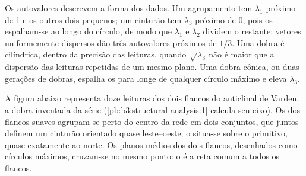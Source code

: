 Os autovalores descrevem a forma dos dados. Um agrupamento tem $\lambda_1$ próximo de
1 e os outros dois pequenos; um cinturão tem $\lambda_3$ próximo de 0, pois os 
espalham-se ao longo do círculo, de modo que $\lambda_1$ e $\lambda_2$ dividem o restante;
vetores uniformemente dispersos dão três autovalores próximos de $1/3$. Uma dobra é
cilíndrica, dentro da precisão das leituras, quando $\sqrt{\lambda_3}$ não é
maior que a dispersão das leituras repetidas de um mesmo plano. Uma dobra cônica,
ou duas gerações de dobras, espalha os  para longe de qualquer círculo máximo
e eleva $\lambda_3$.

A figura abaixo representa doze leituras dos dois flancos do anticlinal de Varden,
a dobra inventada da série (\cref{pb:b3:structural-analysis:1}
calcula seu eixo). Os  dos flancos suaves agrupam-se perto do centro da
rede em dois conjuntos, que juntos definem um cinturão orientado quase
leste--oeste; o  situa-se sobre o primitivo, quase exatamente ao norte. Os
planos médios dos dois flancos, desenhados como círculos máximos, cruzam-se no mesmo ponto:
o  é a reta comum a todos os flancos.

